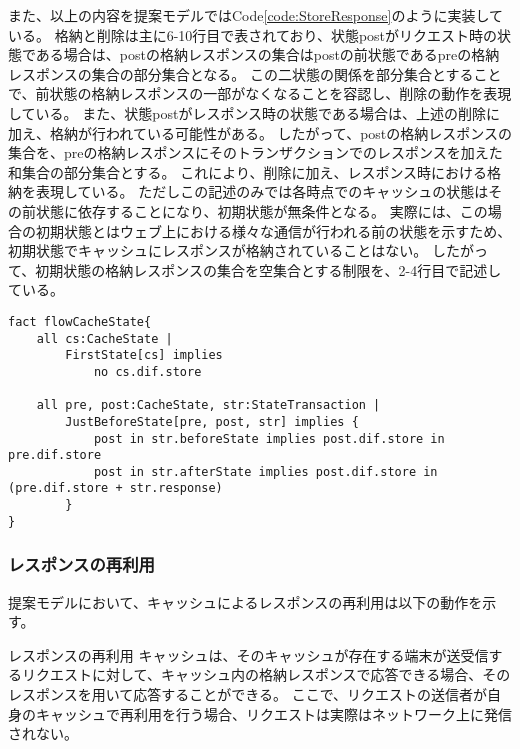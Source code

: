 \documentclass[journal]{IEEEtran}
\begin{document}
また、以上の内容を提案モデルではCode\ref{code:StoreResponse}のように実装している。
格納と削除は主に6-10行目で表されており、状態postがリクエスト時の状態である場合は、postの格納レスポンスの集合はpostの前状態であるpreの格納レスポンスの集合の部分集合となる。
この二状態の関係を部分集合とすることで、前状態の格納レスポンスの一部がなくなることを容認し、削除の動作を表現している。
また、状態postがレスポンス時の状態である場合は、上述の削除に加え、格納が行われている可能性がある。
したがって、postの格納レスポンスの集合を、preの格納レスポンスにそのトランザクションでのレスポンスを加えた和集合の部分集合とする。
これにより、削除に加え、レスポンス時における格納を表現している。
ただしこの記述のみでは各時点でのキャッシュの状態はその前状態に依存することになり、初期状態が無条件となる。
実際には、この場合の初期状態とはウェブ上における様々な通信が行われる前の状態を示すため、初期状態でキャッシュにレスポンスが格納されていることはない。
したがって、初期状態の格納レスポンスの集合を空集合とする制限を、2-4行目で記述している。

\begin{lstlisting}[caption=レスポンスの格納と削除の表現, label=code:StoreResponse]
fact flowCacheState{
	all cs:CacheState |
		FirstState[cs] implies
			no cs.dif.store

	all pre, post:CacheState, str:StateTransaction |
		JustBeforeState[pre, post, str] implies {
			post in str.beforeState implies post.dif.store in pre.dif.store
			post in str.afterState implies post.dif.store in (pre.dif.store + str.response)
		}
}
\end{lstlisting}

\subsubsection{レスポンスの再利用}
提案モデルにおいて、キャッシュによるレスポンスの再利用は以下の動作を示す。

\begin{itembox}[l]{レスポンスの再利用}
キャッシュは、そのキャッシュが存在する端末が送受信するリクエストに対して、キャッシュ内の格納レスポンスで応答できる場合、そのレスポンスを用いて応答することができる。
ここで、リクエストの送信者が自身のキャッシュで再利用を行う場合、リクエストは実際はネットワーク上に発信されない。
\end{itembox}
\end{document}
